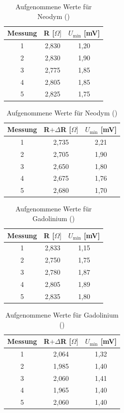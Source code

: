\begin{table}[htbp]
\begin{tabular}{|c|c|c|}
Messung	& R [$\Omega]$	&$U_\text{min}$ [mV]\\ \hline
1&	2,830&	1,20\\ \hline
2&	2,830&	1,90\\ \hline
3&	2,775&	1,85\\ \hline
4&	2,805&	1,85\\ \hline
5&	2,825&	1,75\\ \hline
\end{tabular}
\begin{tabular}{|c|c|c|}
Messung	& R$+\Delta$R [$\Omega]$&$U_\text{min}$ [mV] \\ \hline
1&	2,735&	2,21\\ \hline
2&	2,705&	1,90\\ \hline
3&	2,650&	1,80\\ \hline
4&	2,675&	1,76\\ \hline
5&	2,680&	1,70\\ \hline
\end{tabular}
\caption{Aufgenommene Werte für Neodym ()}
\label{t_werte}
\end{table}

\begin{table}[htbp]
\begin{tabular}{|c|c|c|}
Messung	& R [$\Omega]$	&$U_\text{min}$ [mV]\\ \hline
1&	2,833&	1,15\\ \hline
2&	2,750&	1,75\\ \hline
3&	2,780&	1,87\\ \hline
4&	2,805&	1,89\\ \hline
5&	2,835&	1,80\\ \hline
\end{tabular}
\begin{tabular}{|c|c|c|}
Messung	& R$+\Delta$R [$\Omega]$&$U_\text{min}$ [mV] \\ \hline
1&	2,064&	1,32\\ \hline
2&	1,985&	1,40\\ \hline
3&	2,060&	1,41\\ \hline
4&	1,965&	1,40\\ \hline
5&	2,060&	1,40\\ \hline
\end{tabular}
\caption{Aufgenommene Werte für Gadolinium ()}
\label{t_werte}
\end{table}


